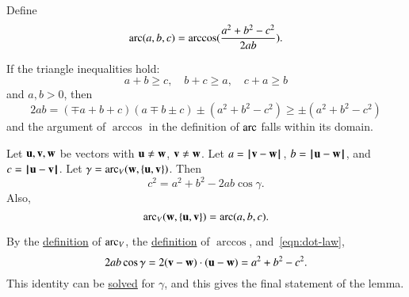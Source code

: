 
\begin{definition}[arc]\label{def:arc}
Define
\begin{displaymath}\operatorname{arc}(a,b,c) = \arccos(\frac{a^2 + b^2 - c^2}{2 a
    b}).\end{displaymath}
%
\end{definition}

If the triangle inequalities hold:
\begin{displaymath}
a + b \ge c,\quad b + c \ge a, \quad c+a \ge b
\end{displaymath}
and $a,b >0$, then
\begin{displaymath}
  2 a b = (\mp a+b+c)(a \mp b \pm c) \pm (a^2 + b^2 - c^2) 
\ge \pm  (a^2 + b^2 - c^2)
\end{displaymath}
and the argument of $\arccos$ in the definition of $\operatorname{arc}$ falls within
its domain.

\begin{lemma}\label{lemma:loc}
Let ${\mathbf u},{\mathbf v},{\mathbf w}$ be vectors with ${\mathbf u}\ne {\mathbf w}$, ${\mathbf v}\ne {\mathbf w}$.  Let $a
= \norm{\v }{ \w}$, $b = \norm{\u }{ \w}$, and $c = \norm{\u }{ \v}$.
Let $\gamma=\operatorname{arc}_V({\mathbf w},\{{\mathbf u},{\mathbf v}\})$.    Then
\begin{displaymath}c^2 = a^2 + b^2 - 2 a b \cos\gamma.\end{displaymath}
Also,
\begin{displaymath}
\operatorname{arc}_V({\mathbf w},\{{\mathbf u},{\mathbf v}\})= \operatorname{arc}(a,b,c).
\end{displaymath}

\end{lemma}
%
%
%
%

\begin{proved}
By the \hyperref[def:angle]{definition} of $\operatorname{arc}_V$, the
\hyperref[def:arccos]{definition} of $\arccos$, and~\eqref{eqn:dot-law},
\begin{displaymath}
2 a b \cos \gamma = 2 ({\mathbf v} - {\mathbf w})\cdot ({\mathbf u} - {\mathbf w}) = a^2 + b^2 - c^2.
\end{displaymath}
This identity can be \hyperref[def:arccos]{solved} for $\gamma$, and
this gives the final statement of the lemma.  \swallowed\end{proved}


